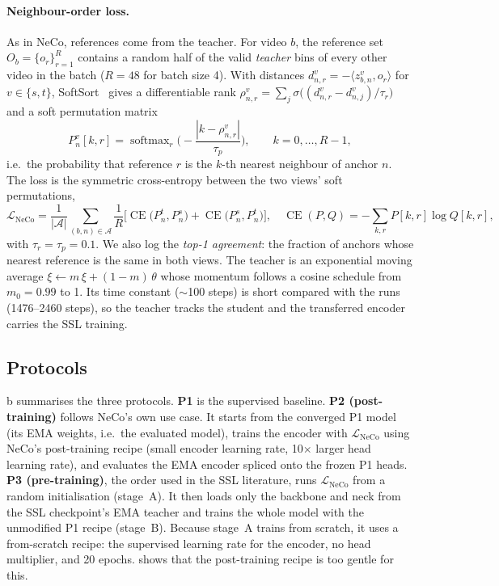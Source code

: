 \documentclass[10pt,a4paper]{article}
\begin{document}
\paragraph{Neighbour-order loss.} As in NeCo, references come from the teacher. For video
$b$, the reference set $O_b=\{o_r\}_{r=1}^{R}$ contains a random half of the valid
\emph{teacher} bins of every other video in the batch ($R=48$ for batch size 4). With
distances $d^{v}_{n,r}=-\langle z^{v}_{b,n}, o_r\rangle$ for $v\in\{s,t\}$,
SoftSort~\cite{prillo2020softsort} gives a differentiable rank
$\rho^{v}_{n,r}=\sum_{j}\sigma\big((d^{v}_{n,r}-d^{v}_{n,j})/\tau_r\big)$ and a soft
permutation matrix
\begin{equation}
P^{v}_{n}[k,r]=\operatorname{softmax}_r\!\Big(-\frac{|k-\rho^{v}_{n,r}|}{\tau_p}\Big),
\qquad k=0,\dots,R-1,
\end{equation}
i.e.\ the probability that reference $r$ is the $k$-th nearest neighbour of anchor $n$.
The loss is the symmetric cross-entropy between the two views' soft permutations,
\begin{equation}
\mathcal{L}_{\text{NeCo}}=\frac{1}{|\mathcal{A}|}\sum_{(b,n)\in\mathcal{A}}\frac{1}{R}
\Big[\operatorname{CE}\big(P^{t}_{n},P^{s}_{n}\big)+\operatorname{CE}\big(P^{s}_{n},P^{t}_{n}\big)\Big],
\quad \operatorname{CE}(P,Q)=-\sum_{k,r}P[k,r]\log Q[k,r],
\end{equation}
with $\tau_r=\tau_p=0.1$. We also log the \emph{top-1 agreement}: the fraction of anchors
whose nearest reference is the same in both views. The teacher is an exponential moving
average $\xi\leftarrow m\,\xi+(1-m)\,\theta$ whose momentum follows a cosine schedule
from $m_0=0.99$ to 1. Its time constant ($\sim$100 steps) is short compared with the runs
(1476--2460 steps), so the teacher tracks the student and the transferred encoder carries
the SSL training.

\subsection{Protocols}
b summarises the three protocols. \textbf{P1} is the supervised
baseline. \textbf{P2 (post-training)} follows NeCo's own use case. It starts from the
converged P1 model (its EMA weights, i.e.\ the evaluated model), trains the encoder with
$\mathcal{L}_{\text{NeCo}}$ using NeCo's post-training recipe (small encoder learning rate,
10$\times$ larger head learning rate), and evaluates the EMA encoder spliced onto the
frozen P1 heads. \textbf{P3 (pre-training)}, the order used in the SSL literature, runs
$\mathcal{L}_{\text{NeCo}}$ from a random initialisation (stage~A). It then loads only the
backbone and neck from the SSL checkpoint's EMA teacher and trains the whole model with
the unmodified P1 recipe (stage~B). Because stage~A trains from scratch, it uses a
from-scratch recipe: the supervised learning rate for the encoder, no head multiplier, and
20 epochs.  shows that the post-training recipe is too gentle for this.
\end{document}
